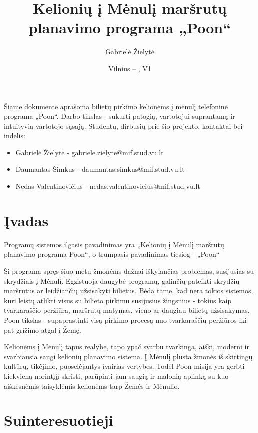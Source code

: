 \documentclass{VUMIFPSkursinis}
\title{Kelionių į Mėnulį maršrutų planavimo programa „Poon“}
\author{Gabrielė Žielytė}
\date{Vilnius – \the\year, V1}
\begin{document}
	
\maketitle

\thispagestyle{empty}
\tableofcontents


Šiame dokumente aprašoma bilietų pirkimo kelionėms į mėnulį telefoninė programa „Poon“. Darbo tikslas - sukurti patogią, vartotojui suprantamą ir intuityvią vartotojo sąsają.
Studentų, dirbusių prie šio projekto, kontaktai bei indėlis:
\begin{itemize}
\item Gabrielė Žielytė - gabriele.zielyte@mif.stud.vu.lt
\item Daumantas Šimkus - daumantas.simkus@mif.stud.vu.lt
\item Nedas Valentinovičius - nedas.valentinovicius@mif.stud.vu.lt
\end{itemize}
\thispagestyle{empty}

\cleardoublepage{}
\setcounter{page}{4}

\section{Įvadas}
Programų sistemos ilgasis pavadinimas yra „Kelionių į Mėnulį maršrutų planavimo programa Poon“, o trumpasis pavadinimas tiesiog - „Poon“

Ši programa spręs šiuo metu žmonėms dažnai iškylančias problemas, susijusias su skrydžiais į Mėnulį. Egzistuoja daugybė programų, galinčių pateikti skrydžių maršrutus ar leidžiančių užsisakyti bilietus. Bėda tame, kad nėra tokios sistemos, kuri leistų atlikti visus su bilieto pirkimu susijusius žingsnius - tokius kaip tvarkaraščio peržiūra, maršrutų matymas, vieno ar daugiau bilietų užsisakymas. Poon tikslas - supaprastinti visą pirkimo procesą nuo tvarkaraščių peržiūros iki pat grįžimo atgal į Žemę.

Kelionėms į Mėnulį tapus realybe, tapo ypač svarbu tvarkinga, aiški, moderni ir svarbiausia saugi kelionių planavimo sistema. Į Mėnulį plūsta žmonės iš skirtingų kultūrų, tikėjimo, puoselėjantys įvairias vertybes. Todėl Poon misija yra gerbti kiekvieną norintįjį skristi, parūpinti jam saugią ir malonią aplinką su kuo aiškesnėmis taisyklėmis kelionėms tarp Žemės ir Mėnulio.



\section{Suinteresuotieji}
\end{document}
